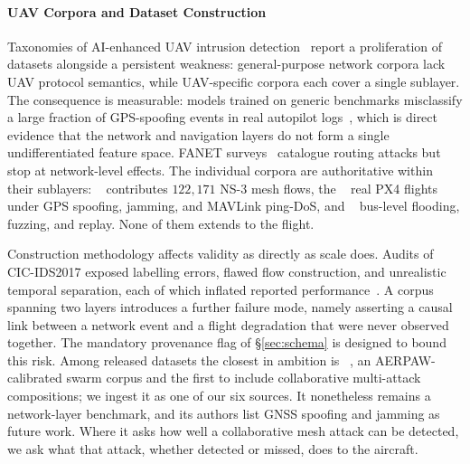 \paragraph{UAV Corpora and Dataset Construction}
Taxonomies of AI-enhanced UAV intrusion detection~\cite{islam2025uavids} report
a proliferation of datasets alongside a persistent weakness: general-purpose
network corpora lack UAV protocol semantics, while UAV-specific corpora each
cover a single sublayer. The consequence is measurable: models trained on
generic benchmarks misclassify a large fraction of GPS-spoofing events in real
autopilot logs~\cite{islam2025uavids}, which is direct evidence that the
network and navigation layers do not form a single undifferentiated feature
space. FANET surveys~\cite{tsao2022survey,ceviz2024survey} catalogue routing
attacks but stop at network-level effects. The individual corpora are
authoritative within their sublayers: ~\cite{uavids2025}
contributes $122{,}171$ NS-3 mesh flows, the ~\cite{whelan2020uav,whelan2020novelty} real PX4 flights under GPS
spoofing, jamming, and MAVLink ping-DoS, and ~\cite{hcrl_uavcan} bus-level flooding, fuzzing, and replay. None of them
extends to the flight.

Construction methodology affects validity as directly as scale does. Audits of
CIC-IDS2017 exposed labelling errors, flawed flow construction, and unrealistic
temporal separation, each of which inflated reported
performance~\cite{engelen2021troubleshooting,sharafaldin2018cicids}. A corpus
spanning two layers introduces a further failure mode, namely asserting a causal
link between a network event and a flight degradation that were never observed
together. The mandatory provenance flag of \S\ref{sec:schema} is designed to
bound this risk. Among released datasets the closest in ambition is
~\cite{uavcas2026}, an AERPAW-calibrated swarm corpus and the
first to include collaborative multi-attack compositions; we ingest it as one of
our six sources. It nonetheless remains a network-layer benchmark, and its
authors list GNSS spoofing and jamming as future work. Where it asks how well a
collaborative mesh attack can be detected, we ask what that attack, whether
detected or missed, does to the aircraft.

